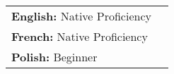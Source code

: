 \begin{tabularx}{\linewidth}{@{}l X@{}}
    \textbf{English:} Native Proficiency \\
    \textbf{French:} Native Proficiency \\
    \textbf{Polish:} Beginner\\  
\end{tabularx}